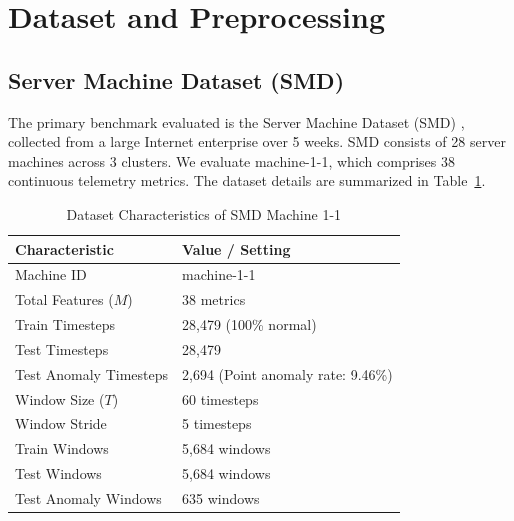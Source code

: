 \documentclass[conference]{IEEEtran}
\begin{document}
\section{Dataset and Preprocessing}

\subsection{Server Machine Dataset (SMD)}
The primary benchmark evaluated is the Server Machine Dataset (SMD) \cite{su2019omnianomaly}, collected from a large Internet enterprise over 5 weeks. SMD consists of 28 server machines across 3 clusters. We evaluate machine-1-1, which comprises 38 continuous telemetry metrics. The dataset details are summarized in Table~\ref{tab:dataset_summary}.

\begin{table}[h]
\caption{Dataset Characteristics of SMD Machine 1-1}
\label{tab:dataset_summary}
\centering
\begin{tabular}{ll}
\toprule
\textbf{Characteristic} & \textbf{Value / Setting} \\
\midrule
Machine ID & machine-1-1 \\
Total Features ($M$) & 38 metrics \\
Train Timesteps & 28,479 (100\% normal) \\
Test Timesteps & 28,479 \\
Test Anomaly Timesteps & 2,694 (Point anomaly rate: 9.46\%) \\
Window Size ($T$) & 60 timesteps \\
Window Stride & 5 timesteps \\
Train Windows & 5,684 windows \\
Test Windows & 5,684 windows \\
Test Anomaly Windows & 635 windows \\
\bottomrule
\end{tabular}
\end{table}
\end{document}
